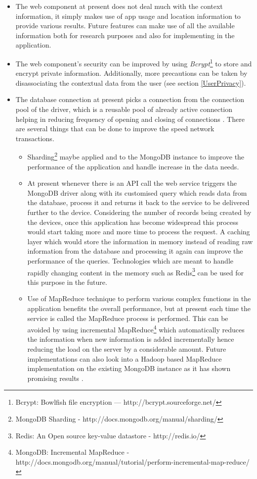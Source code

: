 \documentclass[12pt]{report}
\begin{document}
\begin{itemize}

\item The web component at present does not deal much with the context information, it simply makes use of app usage and location information to provide various results. Future features can make use of all the available information both for research purposes and also for implementing in the application. 

\item The web component's security can be improved by using \textit{Bcrypt}\footnote{Bcrypt: Bowlfish file encryption — http://bcrypt.sourceforge.net/} to store and encrypt private information. Additionally, more precautions can be taken by disassociating the contextual data from the user (see section \ref{UserPrivacy}).

\item The database connection at present picks a connection from the connection pool of the driver, which is a reusable pool of already active connection helping in reducing frequency of opening and closing of connections \cite{MongoLab2013}. There are several things that can be done to improve the speed network transactions.
    \begin{itemize}
        \item Sharding\footnote{MongoDB Sharding - http://docs.mongodb.org/manual/sharding/} maybe applied and to the MongoDB instance to improve the performance of the application and handle increase in the data needs.
        \item At present whenever there is an API call the web service triggers the MongoDB driver along with its customised query which reads data from the database, process it and returns it back to the service to be delivered further to the device. Considering the number of records being created by the devices, once this application has become widespread this process would start taking more and more time to process the request. A caching layer which would store the information in memory instead of reading raw information from the database and processing it again can improve the performance of the queries. Technologies which are meant to handle rapidly changing content in the memory such as Redis\footnote{Redis: An Open source key-value datastore - http://redis.io/} can be used for this purpose in the future.
        
       \item Use of MapReduce technique to perform various complex functions in the application benefits the overall performance, but at present each time the service is called the MapReduce process is performed. This can be avoided by using incremental MapReduce\footnote{MongoDB: Incremental MapReduce - http://docs.mongodb.org/manual/tutorial/perform-incremental-map-reduce/} which automatically reduces the information when new information is added incrementally hence reducing the load on the server by a considerable amount. Future implementations can also look into a Hadoop based MapReduce implementation on the existing MongoDB instance as it has shown promising results \cite{dede2013performance}.
    \end{itemize}


\end{itemize}
\end{document}
